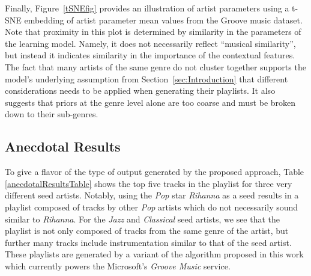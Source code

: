  
Finally, Figure~\ref{tSNEfig} provides an illustration of artist parameters using a t-SNE embedding \cite{Maaten2008} of artist parameter mean values from the Groove music dataset. 
Note that proximity in this plot is determined by similarity in the parameters of the learning model. Namely, it does not necessarily reflect ``musical similarity'', but instead it indicates similarity in the importance of the contextual features. The fact that many artists of the same genre do not cluster together supports the model's underlying assumption from Section~\ref{sec:Introduction} that different considerations needs to be applied when generating their playlists. It also suggests that priors at the genre level alone are too coarse and must be broken down to their sub-genres. 


\subsection{Anecdotal Results}

To give a flavor of the type of output generated by the proposed approach, Table \ref{anecdotalResultsTable} shows the top five tracks in the playlist for three very different seed artists. Notably, using the \textit{Pop} star \textit{Rihanna} as a seed results in a playlist composed of tracks by other \textit{Pop} artists which do not necessarily sound similar to \textit{Rihanna}. For the \textit{Jazz} and \textit{Classical} seed artists, we see that the playlist is not only composed of tracks from the same genre of the artist, but further many tracks include instrumentation similar to that of the seed artist. These playlists are generated by a variant of the algorithm proposed in this work which currently powers the Microsoft's \textit{Groove Music} service.



